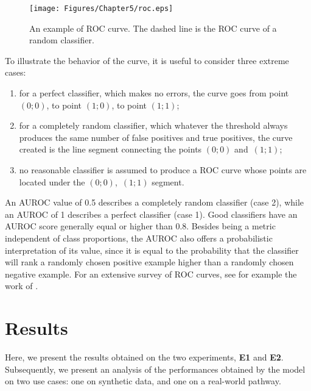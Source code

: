 \begin{figure}[h!]
    \centering
    \texttt{[image: Figures/Chapter5/roc.eps]}
    \caption{An example of ROC curve. The dashed line is the ROC curve of a random classifier.}
    \label{fig:roc}
\end{figure}
To illustrate the behavior of the curve, it is useful to consider three extreme cases:
\begin{enumerate}
\item for a perfect classifier, which makes no errors, the curve goes from point $(0;0)$, to point $(1;0)$, to point $(1;1)$;
\item for a completely random classifier, which whatever the threshold always produces the same number of false positives and true positives, the curve created is the line segment connecting the points $(0;0)$ and $\,(1;1)$;
\item no reasonable classifier is assumed to produce a ROC curve whose points are located under the $(0;0)$, $\,(1;1)$ segment.
\end{enumerate}
An AUROC value of 0.5 describes a completely random classifier (case 2), while an AUROC of 1 describes a perfect classifier (case 1). Good classifiers have an AUROC score generally equal or higher than 0.8. Besides being a metric independent of class proportions, the AUROC also offers a probabilistic interpretation of its value, since it is equal to the probability that the classifier will rank a randomly chosen positive example higher than a randomly chosen negative example. For an extensive survey of ROC curves, see for example the work of \citet{fawcett2006roc}.

\section{Results}
Here, we present the results obtained on the two experiments, \textbf{E1} and \textbf{E2}. Subsequently, we present an analysis of the performances obtained by the model on two use cases: one on synthetic data, and one on a real-world pathway.

